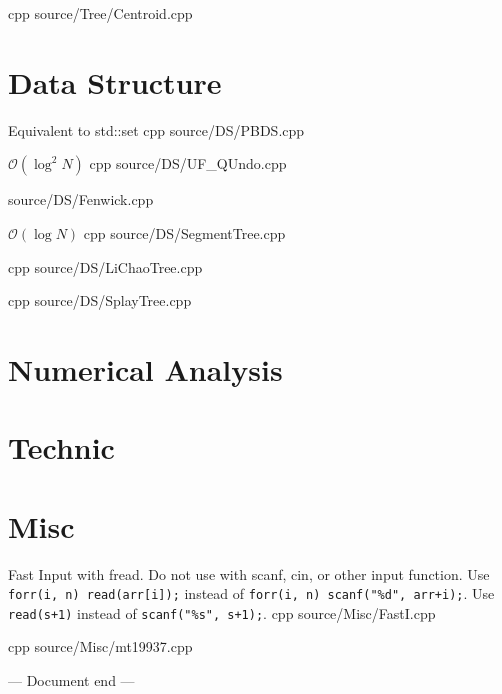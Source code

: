 \documentclass[landscape, 8pt, a4paper, oneside]{extarticle}
\begin{document}
\begin{multicols}{3}
{}
{}
{cpp}
{source/Tree/Centroid.cpp}

\section{Data Structure}

{}
{Equivalent to std::set}
{cpp}
{source/DS/PBDS.cpp}


{}
{$\mathcal O(\log^2N)$}
{cpp}
{source/DS/UF_QUndo.cpp}

{source/DS/Fenwick.cpp}

{}
{$\mathcal O(\log N)$}
{cpp}
{source/DS/SegmentTree.cpp}

{}
{}
{cpp}
{source/DS/LiChaoTree.cpp}

{}
{}
{cpp}
{source/DS/SplayTree.cpp}

\section{Numerical Analysis}


\section{Technic}


\section{Misc}

{Fast Input with fread. Do not use with scanf, cin, or other input function. Use \texttt{forr(i, n) read(arr[i]);} instead of \texttt{forr(i, n) scanf("\%d", arr+i);}. Use \texttt{read(s+1)} instead of \texttt{scanf("\%s", s+1);}.}
{}
{cpp}
{source/Misc/FastI.cpp}

{}
{}
{cpp}
{source/Misc/mt19937.cpp}

\begin{center}
\bigskip
--- Document end ---
\end{center}

\end{multicols}
\end{document}
